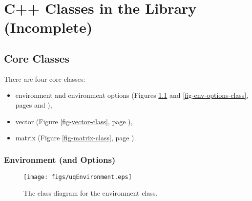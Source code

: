 \chapter{C++ Classes in the Library (Incomplete)}\label{ch-classes}
\thispagestyle{headings}



\section{Core Classes}

There are four core classes:
\begin{itemize}
\item environment and environment options (Figures \ref{fig-env-class} and \ref{fig-env-options-class}, pages \pageref{fig-env-class} and \pageref{fig-env-options-class}),
\item vector (Figure \ref{fig-vector-class}, page \pageref{fig-vector-class}),
\item matrix (Figure \ref{fig-matrix-class}, page \pageref{fig-matrix-class}).
\end{itemize}

\clearpage
\subsection{Environment (and Options)}

\begin{figure}[h!]
\begin{center}
\texttt{[image: figs/uqEnvironment.eps]}
\end{center}
\caption{
The class diagram for the environment class.
}
\label{fig-env-class}
\end{figure}

